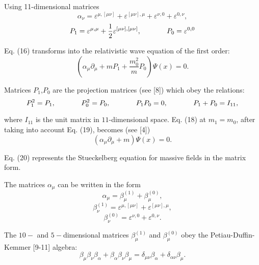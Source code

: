 \documentclass[a4paper,12pt]{article}
\begin{document}
Using 11-dimensional matrices
\[
\alpha _\nu =\varepsilon ^{\mu ,[\mu \nu ]}+\varepsilon ^{[\mu \nu
],\mu }+\varepsilon ^{\nu ,0}+\varepsilon ^{0,\nu },
\]
\vspace{-8mm}
\begin{equation}
\label{17}
\end{equation}
\vspace{-8mm}
\[
P_1=\varepsilon ^{\mu ,\mu }+\frac 12\varepsilon ^{[\mu \nu ],[\mu
\nu ]},\hspace{0.5in}P_0=\varepsilon ^{0,0}
\]

Eq. (16) transforms into the relativistic wave equation of the
first order:
\begin{equation}
\left( \alpha _\mu \partial _\mu +m P_1+\frac{m^2_0}{m} P_0\right)
\Psi (x)=0. \label{18}
\end{equation}

Matrices $P_1$,$P_0$ are the projection matrices (see [8]) which
obey the relations:
\begin{equation}
P_1^2=P_1,\hspace{0.5in}P_0^2=P_0,\hspace{0.5in}P_1 P_0=0,
\hspace{0.5in}P_1+P_0=I_{11}, \label{19}
\end{equation}

where $I_{11}$ is the unit matrix in $11$-dimensional space. Eq.
(18) at $ m_1=m_0$, after taking into account Eq. (19), becomes
(see [4])
\begin{equation}
\left( \alpha _\mu \partial _\mu +m\right) \Psi (x)=0. \label{20}
\end{equation}

Eq. (20) represents the Stueckelberg equation for massive fields
in the matrix form.

The matrices $\alpha _\mu $ can be written in the form
\[
\alpha _\mu =\beta _\mu ^{(1)}+\beta _\mu ^{(0)},
\]
\begin{equation}
\beta _\nu ^{(1)}=\varepsilon ^{\mu ,[\mu \nu ]}+\varepsilon
^{[\mu \nu ],\mu }, \label{21}
\end{equation}
\[
\beta _\nu ^{(0)}=\varepsilon ^{\nu ,0}+\varepsilon ^{0,\nu }.
\]

The $10-$ and $5-$dimensional matrices $\beta _\mu ^{(1)}$ and
$\beta _\mu ^{(0)}$ obey the Petiau-Duffin-Kemmer [9-11] algebra:
\begin{equation}
\beta _\mu \beta _\nu \beta _\alpha +\beta _\alpha \beta _\nu
\beta _\mu =\delta _{\mu \nu }\beta _\alpha +\delta _{\alpha \nu
}\beta _\mu. \label{22}
\end{equation}
\end{document}
